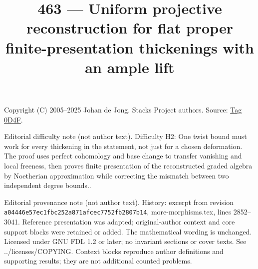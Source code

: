 \documentclass{amsart}
\theoremstyle{plain}
\theoremstyle{definition}
\theoremstyle{remark}
\numberwithin{equation}{subsection}
\begin{document}
\title[Stacks Project, Tag 0D4F]{463 --- Uniform projective reconstruction for flat proper finite-presentation thickenings with an ample lift}
\maketitle
\noindent Copyright (C) 2005--2025 Johan de Jong. Stacks Project authors. Source: \href{https://stacks.math.columbia.edu/tag/0D4F}{Tag 0D4F}.

\noindent Editorial difficulty note (not author text). Difficulty H2: One twist bound must work for every thickening in the statement, not just for a chosen deformation. The proof uses perfect cohomology and base change to transfer vanishing and local freeness, then proves finite presentation of the reconstructed graded algebra by Noetherian approximation while correcting the mismatch between two independent degree bounds..

\noindent Editorial provenance note (not author text). History: excerpt from revision \texttt{a0444\allowbreak 6e57e\allowbreak c1fbc\allowbreak 252a8\allowbreak 71afc\allowbreak ec775\allowbreak 2fb28\allowbreak 07b14}, more-morphisms.tex, lines 2852--3041. Reference presentation was adapted; original-author context and core support blocks were retained or added. The mathematical wording is unchanged. Licensed under GNU FDL 1.2 or later; no invariant sections or cover texts. See ../licenses/COPYING. Context blocks reproduce author definitions and supporting results; they are not additional counted problems.
\end{document}
